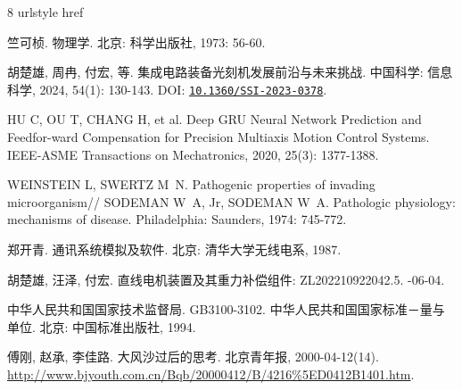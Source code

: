 \documentclass[degree=bachelor]{thuthesis}
\begin{document}
\begin{thebibliography}{8}
\providecommand{\natexlab}[1]{#1}
\providecommand{\url}[1]{#1}
\expandafter\ifx\csname urlstyle\endcsname\relax\else
  \fi
\expandafter\ifx\csname href\endcsname\relax
  \DeclareUrlCommand{}
  \def\eprint#1#2{#2}
\else
  \def\doi#1{\href{https://doi.org/#1}{\nolinkurl{#1}}}
  \let\eprint\href
\fi

竺可桢.
\newblock 物理学\allowbreak[M].
\newblock 北京: 科学出版社, 1973: 56-60.

胡楚雄, 周冉, 付宏, 等.
\newblock 集成电路装备光刻机发展前沿与未来挑战\allowbreak[J].
\newblock 中国科学: 信息科学, 2024, 54(1): 130-143.
\newblock DOI: \doi{10.1360/SSI-2023-0378}.

HU C, OU T, CHANG H, et al.
\newblock Deep GRU Neural Network Prediction and Feedfor-ward Compensation for Precision Multiaxis Motion Control Systems\allowbreak[J].
\newblock IEEE-ASME Transactions on Mechatronics, 2020, 25(3): 1377-1388.

WEINSTEIN L, SWERTZ M~N.
\newblock Pathogenic properties of invading
  microorganism\allowbreak[M]//\allowbreak
SODEMAN W~A, Jr, SODEMAN W~A.
\newblock Pathologic physiology: mechanisms of disease.
\newblock Philadelphia: Saunders, 1974: 745-772.

郑开青.
\newblock 通讯系统模拟及软件\allowbreak[D].
\newblock 北京: 清华大学无线电系, 1987.

胡楚雄, 汪泽, 付宏.
\newblock 直线电机装置及其重力补偿组件: ZL202210922042.5\allowbreak[P].
-06-04.

中华人民共和国国家技术监督局.
\newblock GB3100-3102. 中华人民共和国国家标准－量与单位\allowbreak[S].
\newblock 北京: 中国标准出版社, 1994.

傅刚, 赵承, 李佳路.
\newblock 大风沙过后的思考\allowbreak[N/OL].
\newblock 北京青年报, 2000-04-12\allowbreak (14)\allowbreak[2002-03-06].
\newblock \url{http://www.bjyouth.com.cn/Bqb/20000412/B/4216%5ED0412B1401.htm}.

\end{thebibliography}


\appendix
\end{document}
